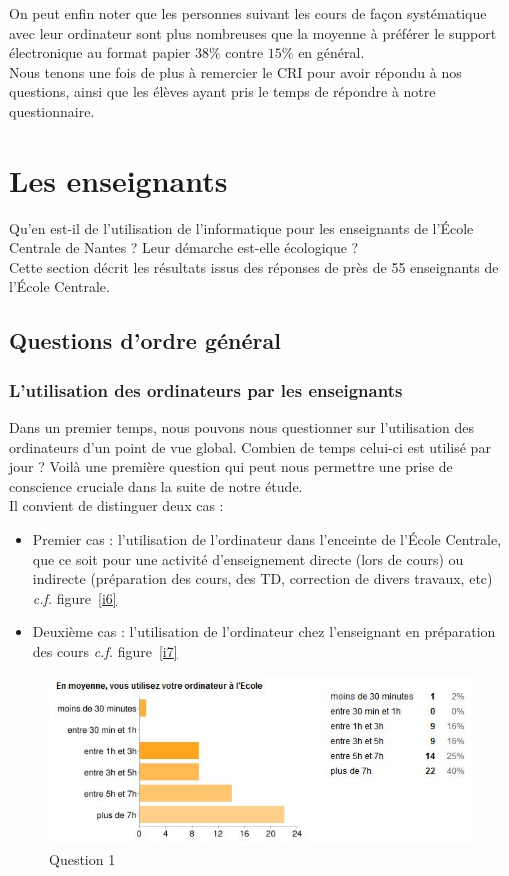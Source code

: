 \documentclass[a4paper,11pt,french]{report}
\begin{document}
On peut enfin noter que les personnes suivant les cours de façon systématique avec leur ordinateur sont plus nombreuses que la moyenne à préférer le support électronique au format papier $38\%$ contre $15\%$ en général.\\

Nous tenons une fois de plus à remercier le CRI pour avoir répondu à nos questions, ainsi que les élèves ayant pris le temps de répondre à notre questionnaire.


\section{Les enseignants}
Qu'en est-il de l'utilisation de l'informatique pour les enseignants de l'École Centrale de Nantes ? Leur démarche est-elle écologique ?\\

Cette section décrit les résultats issus des réponses de près de 55 enseignants de l'École Centrale.

\subsection{Questions d'ordre général}

\subsubsection{L’utilisation des ordinateurs par les enseignants}

Dans un premier temps, nous pouvons nous questionner sur l'utilisation des ordinateurs d'un point de vue global. Combien de temps celui-ci est utilisé par jour ? Voilà une première question qui peut nous permettre une prise de conscience cruciale dans la suite de notre étude.\\

Il convient de distinguer deux cas :
\begin{itemize}
\item Premier cas : l'utilisation de l'ordinateur dans l'enceinte de l'École Centrale, que ce soit pour une activité d'enseignement directe (lors de cours) ou indirecte (préparation des cours, des TD, correction de divers travaux, etc) \textit{c.f.} figure~\vref{i6}
\item Deuxième cas : l'utilisation de l'ordinateur chez l'enseignant en préparation des cours \textit{c.f.} figure~\vref{i7}
\end{itemize}

\begin{figure}[h!]
\includegraphics[width=\textwidth]{i6.PNG}
\caption{Question 1}
\label{i6}
\end{figure}
\end{document}
